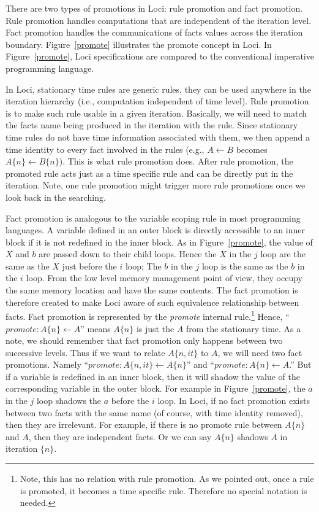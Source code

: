 \documentclass{article}
\begin{document}
There are two types of promotions in Loci: rule promotion and fact
promotion. Rule promotion handles computations that are independent of
the iteration level. Fact promotion handles the communications of
facts values across the iteration boundary. Figure~\ref{promote}
illustrates the promote concept in Loci. In Figure~\ref{promote}, Loci
specifications are compared to the conventional imperative programming
language. 

In Loci, stationary time rules are generic rules, they can
be used anywhere in the iteration hierarchy (i.e., computation
independent of time level). Rule promotion is to make
such rule usable in a given iteration. Basically, we will need to
match the facts name being produced in the iteration with the
rule. Since stationary time rules do not have time information
associated with them, we then append a time identity to every fact
involved in the rules (e.g., $A \gets B$ becomes
$A\{n\} \gets B\{n\}$). This is what rule promotion does. After rule
promotion, the promoted rule acts just as a time specific rule and can
be directly put in the iteration. Note, one rule promotion might
trigger more rule promotions once we look back in the searching.

Fact promotion is analogous to the variable scoping rule in most
programming languages. A variable defined in an outer block is
directly accessible to an inner block if it is not redefined in the
inner block. As in Figure~\ref{promote}, the value of $X$ and $b$ are
passed down to their child loops. Hence the $X$ in the $j$
loop are the same as the $X$ just before the $i$ loop; The $b$ in the
$j$ loop is the same as the $b$ in the $i$ loop. From the low level
memory management point of view, they occupy the same memory location
and have the same contents. The fact promotion is therefore created to
make Loci aware of such equivalence relationship between facts. Fact
promotion is represented by the {\it promote} internal
rule.\footnote{Note, this has no relation with rule promotion. As we
  pointed out, once a rule is promoted, it becomes a time
  specific rule. Therefore no special notation is needed.} Hence,
``$promote: A\{n\} \gets A$'' means $A\{n\}$ is just the $A$ from the
stationary time. As a note, we should remember that fact promotion
only happens between two successive levels. Thus if we want to relate
$A\{n,it\}$ to $A$, we will need two fact promotions. Namely 
``$promote: A\{n,it\} \gets A\{n\}$'' and 
``$promote: A\{n\} \gets A$.''
But if a variable is redefined in an inner block,
then it will shadow the value of the corresponding variable in the
outer block. For example in Figure~\ref{promote}, the $a$ in the $j$
loop shadows the $a$ before the $i$ loop. In Loci, if no fact
promotion exists between two facts with the same name (of course, with
time identity removed), then they are irrelevant. For example, if
there is no promote rule between $A\{n\}$ and $A$, then they are
independent facts. Or we can say $A\{n\}$ shadows $A$ in iteration
$\{n\}$. 
\end{document}
